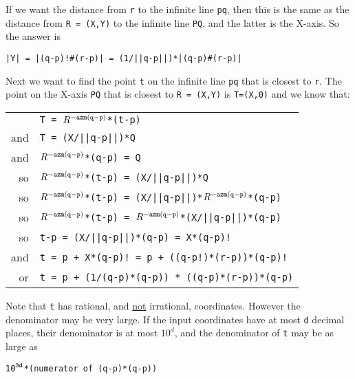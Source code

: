 \documentclass[12pt]{article}
\begin{document}
If\label{DISTANCE-OF-LINE-TO-POINT}
we want the distance from {\tt r} to the infinite line {\tt pq},
then this is the same as the distance from {\tt R = (X,Y)} to the infinite
line {\tt PQ}, and the latter is the X-axis.  So the answer is \\
\centerline{\tt |Y| = |(q-p)!\#(r-p)| = (1/||q-p||)*|(q-p)\#(r-p)|}

Next we want to find the point {\tt t} on the infinite line {\tt pq}
that is closest to {\tt r}.
The point on the X-axis {\tt PQ} that is closest to {\tt R = (X,Y)}
is {\tt T=(X,0)} and
we know that: \\
\hspace*{0.3in}\begin{tabular}{rl}
       & {\tt T = $R^{\tt -azm(q-p)}$*(t-p)} \\
   and & {\tt T = (X/||q-p||)*Q} \\
   and & {\tt $R^{\tt -azm(q-p)}$*(q-p) = Q} \\
    so & {\tt $R^{\tt -azm(q-p)}$*(t-p) = (X/||q-p||)*Q} \\
    so & {\tt $R^{\tt -azm(q-p)}$*(t-p) =
        (X/||q-p||)*$R^{\tt -azm(q-p)}$*(q-p)} \\
    so & {\tt $R^{\tt -azm(q-p)}$*(t-p) =
        $R^{\tt -azm(q-p)}$*(X/||q-p||)*(q-p)} \\
    so & {\tt t-p = (X/||q-p||)*(q-p) = X*(q-p)!} \\ 
   and & {\tt t = p + X*(q-p)!~= p + ((q-p!)*(r-p))*(q-p)!} \\
   or & {\tt t = p + (1/(q-p)*(q-p)) * ((q-p)*(r-p))*(q-p)} \\
       \end{tabular}

Note that {\tt t} has rational\label{CLOSEST-IS-RATIONAL},
and \underline{not} irrational,
coordinates.  However the denominator may be very large.  If
the input coordinates have at most {\tt d} decimal places,
their denominator is at most $10^d$, and the denominator of {\tt t}
may be as large as \\
\centerline{\tt 10$^{\tt 3d}$*(numerator of (q-p)*(q-p))}

\medskip
\end{document}
